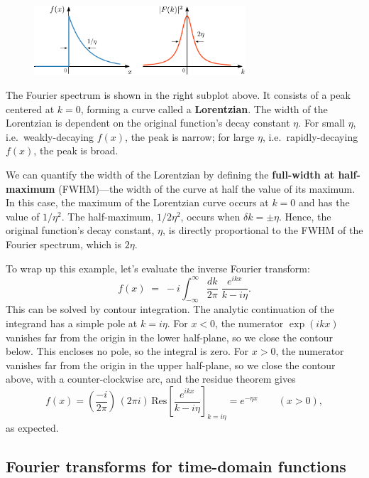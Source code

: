 \documentclass[10pt,a4paper]{article}
\begin{document}
\begin{figure}[h]
  \centering\includegraphics[width=0.7\textwidth]{fourier_example1}
\end{figure}

The Fourier spectrum is shown in the right subplot above. It consists
of a peak centered at $k = 0$, forming a curve called a
\textbf{Lorentzian}. The width of the Lorentzian is dependent on the
original function's decay constant $\eta$. For small $\eta$,
i.e.~weakly-decaying $f(x)$, the peak is narrow; for large $\eta$,
i.e.~rapidly-decaying $f(x)$, the peak is broad.

We can quantify the width of the Lorentzian by defining the
\textbf{full-width at half-maximum} (FWHM)---the width of the curve at
half the value of its maximum. In this case, the maximum of the
Lorentzian curve occurs at $k=0$ and has the value of $1/\eta^2$.  The
half-maximum, $1/2\eta^2$, occurs when $\delta k = \pm \eta$.  Hence,
the original function's decay constant, $\eta$, is directly
proportional to the FWHM of the Fourier spectrum, which is $2\eta$.

To wrap up this example, let's evaluate the inverse Fourier transform:
\begin{equation}
f(x) \; = \; -i\int_{-\infty}^\infty \frac{dk}{2\pi} \; \frac{e^{i kx}}{k-i\eta}.
\end{equation}
This can be solved by contour integration. The analytic continuation
of the integrand has a simple pole at $k = i\eta$. For $x < 0$, the
numerator $\exp(ikx)$ vanishes far from the origin in the lower
half-plane, so we close the contour below. This encloses no pole, so
the integral is zero. For $x > 0$, the numerator vanishes far from the
origin in the upper half-plane, so we close the contour above, with a
counter-clockwise arc, and the residue theorem gives
\begin{equation}
f(x) = \left(\frac{-i}{2\pi}\right) \, \left(2\pi i\right) \, \mathrm{Res}\left[ \frac{e^{ikx}}{k-i\eta}\right]_{k=i\eta} = e^{-\eta x} \qquad(x > 0),
\end{equation}
as expected.

\subsection{Fourier transforms for time-domain functions}
\label{fourier-time}
\end{document}
